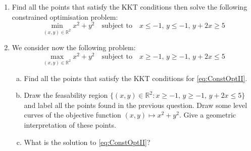 \documentclass{ExerciseSheet}
\newif\ifsolutions
\begin{document}

\begin{problem}
\begin{enumerate}[1.]
	\item Find all the points that satisfy the KKT conditions then solve the following constrained optimisation problem:
	    \begin{equation}\label{ConstOptI}
        \min_{(x,y)\in\mathbb{R}^2} x^2+y^2 \quad \text{subject to} \quad x\leq -1,\, y\leq -1, \, y+2x\geq 5
    \end{equation}
    \item We consider now the following problem:
		\begin{equation}\label{eq:ConstOptII}
    \max_{(x,y)\in\mathbb{R}^2} x^2+y^2 \quad \text{subject to} \quad x\geq -1,\, y\geq -1, \, y+2x\leq 5
		\end{equation}
		\begin{enumerate}[a.] 
		\item Find all the points that satisfy the KKT conditions for \eqref{eq:ConstOptII}.
    	\item Draw the feasability region $\{(x,y)\in\mathbb{R}^2:x\geq -1,\, y\geq -1, \, y+2x\leq 5\}$ and label all the points found in the previous question. Draw some level curves of the objective function $(x,y)\mapsto x^2+y^2$. Give a geometric interpretation of these points.
   	 	\item What is the solution to \eqref{eq:ConstOptII}? 
\normalsize
		\end{enumerate}
\end{enumerate}
\end{problem}

\ifsolutions
\vskip 0.3cm
\end{document}
